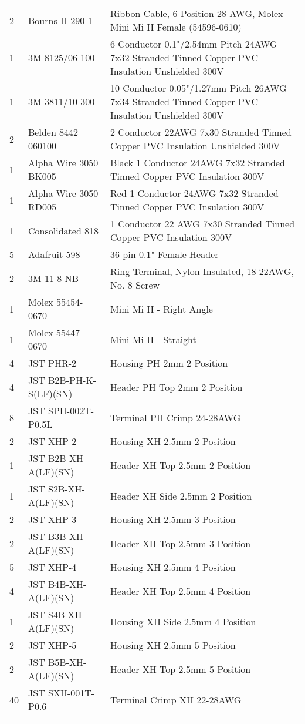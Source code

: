 \begin{longtabu}{X[1,c,m] X[6,c,m] X[9,l,m]}
  2 & Bourns H-290-1 & Ribbon Cable, 6 Position 28 AWG, Molex Mini Mi II Female (54596-0610) \\
  1 & 3M 8125/06 100 & 6 Conductor 0.1"/2.54mm Pitch 24AWG 7x32 Stranded Tinned Copper PVC Insulation Unshielded 300V \\
  1 & 3M 3811/10 300 & 10 Conductor 0.05"/1.27mm Pitch 26AWG 7x34 Stranded Tinned Copper PVC Insulation Unshielded 300V \\
  2 & Belden 8442 060100 & 2 Conductor 22AWG 7x30 Stranded Tinned Copper PVC Insulation Unshielded 300V \\
  1 & Alpha Wire 3050 BK005 & Black 1 Conductor 24AWG 7x32 Stranded Tinned Copper PVC Insulation 300V \\
  1 & Alpha Wire 3050 RD005 & Red 1 Conductor 24AWG 7x32 Stranded Tinned Copper PVC Insulation 300V \\
  1 & Consolidated 818 & 1 Conductor 22 AWG 7x30 Stranded Tinned Copper PVC Insulation 300V \\ \mrule

  5 & Adafruit 598 & 36-pin 0.1" Female Header \\
  2 & 3M 11-8-NB & Ring Terminal, Nylon Insulated, 18-22AWG, No. 8 Screw \\
  1 & Molex 55454-0670 & Mini Mi II - Right Angle \\
  1 & Molex 55447-0670 & Mini Mi II - Straight \\
  4 & JST PHR-2 & Housing PH 2mm 2 Position \\
  4 & JST B2B-PH-K-S(LF)(SN) & Header PH Top 2mm 2 Position \\
  8 & JST SPH-002T-P0.5L & Terminal PH Crimp 24-28AWG \\
  2 & JST XHP-2 & Housing XH 2.5mm 2 Position \\
  1 & JST B2B-XH-A(LF)(SN) & Header XH Top 2.5mm 2 Position \\
  1 & JST S2B-XH-A(LF)(SN) & Header XH Side 2.5mm 2 Position \\
  2 & JST XHP-3 & Housing XH 2.5mm 3 Position \\
  2 & JST B3B-XH-A(LF)(SN) & Header XH Top 2.5mm 3 Position \\
  5 & JST XHP-4 & Housing XH 2.5mm 4 Position \\
  4 & JST B4B-XH-A(LF)(SN) & Header XH Top 2.5mm 4 Position \\
  1 & JST S4B-XH-A(LF)(SN) & Housing XH Side 2.5mm 4 Position \\
  2 & JST XHP-5 & Housing XH 2.5mm 5 Position \\
  2 & JST B5B-XH-A(LF)(SN) & Header XH Top 2.5mm 5 Position \\
  40 & JST SXH-001T-P0.6 & Terminal Crimp XH 22-28AWG \\ \mrule


\end{longtabu}
